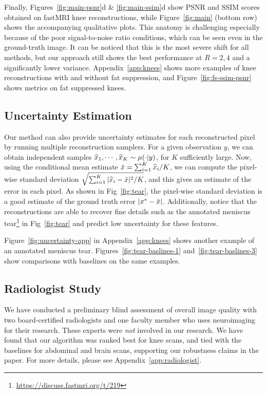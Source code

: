 Finally, Figures~\ref{fig:main-psnr}d \& \ref{fig:main-ssim}d show PSNR and SSIM scores obtained on fastMRI knee reconstructions, while Figure~\ref{fig:main} (bottom row) shows the accompanying qualitative plots. This anatomy is challenging especially because of the poor signal-to-noise ratio conditions, which can be seen even in the ground-truth image. It can be noticed that this is the most severe shift for all methods, but our approach still shows the best performance at $R={2,4}$ and a significantly lower variance.
Appendix~\ref{app:knees} shows more examples of knee reconstructions with and without fat suppression, and Figure~\ref{fig:fs-ssim-psnr} shows metrics on fat suppressed knees. 

\subsection{Uncertainty Estimation}\label{sec:uncertainty}
Our method can also provide uncertainty estimates for each reconstructed pixel by running multiple reconstruction samplers. For a given observation $y$, we can obtain independent samples $\widehat{x}_1, \cdots, \widehat{x}_K \sim \mu(\cdot | y)$, for $K$ sufficiently large. Now, using the conditional mean estimate $\Bar{x} = \sum_{i=1}^K \widehat{x}_i / K$, we can compute the pixel-wise standard deviation $\sqrt{\sum_{i=1}^K | \widehat{x}_i - \Bar{x} |^2 / K}$, and this gives an estimate of the error in each pixel. As shown in Fig~\ref{fig:tear}, the pixel-wise standard deviation is a good estimate of the ground truth error $|x^* - \Bar{x}|$. Additionally, notice that the reconstructions are able to recover fine details such as the annotated meniscus tear\footnote{\url{https://discuss.fastmri.org/t/219}} in Fig~\ref{fig:tear} and predict low uncertainty for these features. 

Figure~\ref{fig:uncertainty-app} in Appendix~\ref{app:knees} shows another example of an annotated meniscus tear. Figures~\ref{fig:tear-baslines-1} and~\ref{fig:tear-baslines-3} show comparisons with baselines on the same examples.

\subsection{Radiologist Study}\label{sec:radiologist}
We have conducted a preliminary blind assessment of overall image quality with two board-certified radiologists and one faculty member who uses neuroimaging for their research. These experts were \emph{not} involved in our research. We have found that our algorithm was ranked best for knee scans, and tied with the baselines for abdominal and brain scans, supporting our robustness claims in the paper. For more details, please see Appendix~\ref{app:radiologist}.

